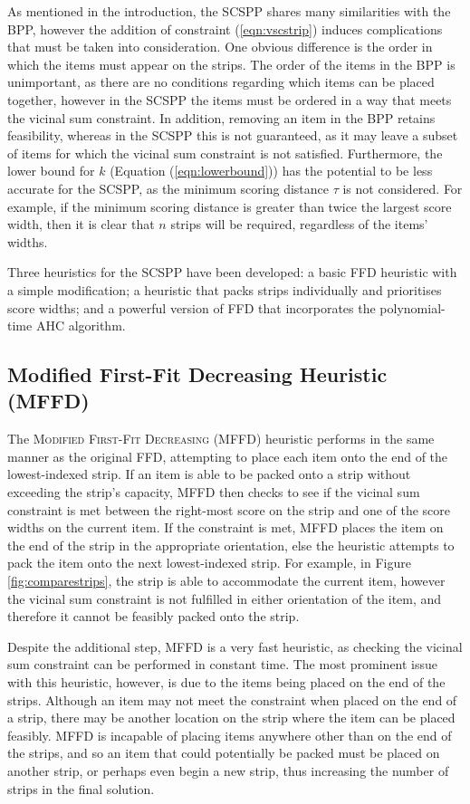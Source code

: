 \documentclass[oribibl]{llncs}
\begin{document}
As mentioned in the introduction, the SCSPP shares many similarities with the BPP, however the addition of constraint (\ref{eqn:vscstrip}) induces complications that must be taken into consideration. One obvious difference is the order in which the items must appear on the strips. The order of the items in the BPP is unimportant, as there are no conditions regarding which items can be placed together, however in the SCSPP the items must be ordered in a way that meets the vicinal sum constraint. In addition, removing an item in the BPP retains feasibility, whereas in the SCSPP this is not guaranteed, as it may leave a subset of items for which the vicinal sum constraint is not satisfied. Furthermore, the lower bound for $k$ (Equation (\ref{eqn:lowerbound})) has the potential to be less accurate for the SCSPP, as the minimum scoring distance $\tau$ is not considered. For example, if the minimum scoring distance is greater than twice the largest score width, then it is clear that $n$ strips will be required, regardless of the items' widths.

Three heuristics for the SCSPP have been developed: a basic FFD heuristic with a simple modification; a heuristic that packs strips individually and prioritises score widths; and a powerful version of FFD that incorporates the polynomial-time AHC algorithm.

\subsection{Modified First-Fit Decreasing Heuristic (MFFD)}
\label{sec:mffd}
The \textsc{Modified First-Fit Decreasing} (MFFD) heuristic performs in the same manner as the original FFD, attempting to place each item onto the end of the lowest-indexed strip. If an item is able to be packed onto a strip without exceeding the strip's capacity, MFFD then checks to see if the vicinal sum constraint is met between the right-most score on the strip and one of the score widths on the current item. If the constraint is met, MFFD places the item on the end of the strip in the appropriate orientation, else the heuristic attempts to pack the item onto the next lowest-indexed strip. For example, in Figure \ref{fig:comparestrips}, the strip is able to accommodate the current item, however the vicinal sum constraint is not fulfilled in either orientation of the item, and therefore it cannot be feasibly packed onto the strip.

Despite the additional step, MFFD is a very fast heuristic, as checking the vicinal sum constraint can be performed in constant time. The most prominent issue with this heuristic, however, is due to the items being placed on the end of the strips. Although an item may not meet the constraint when placed on the end of a strip, there may be another location on the strip where the item can be placed feasibly. MFFD is incapable of placing items anywhere other than on the end of the strips, and so an item that could potentially be packed must be placed on another strip, or perhaps even begin a new strip, thus increasing the number of strips in the final solution.
\end{document}
